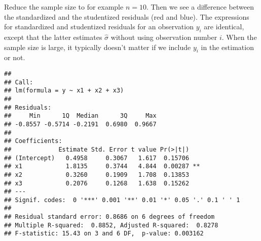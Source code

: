 \documentclass[]{article}
\newenvironment{Shaded}{\begin{snugshade}}{\end{snugshade}}
\newcommand{\KeywordTok}[1]{\textcolor[rgb]{0.13,0.29,0.53}{\textbf{#1}}}
\newcommand{\DataTypeTok}[1]{\textcolor[rgb]{0.13,0.29,0.53}{#1}}
\newcommand{\DecValTok}[1]{\textcolor[rgb]{0.00,0.00,0.81}{#1}}
\newcommand{\OperatorTok}[1]{\textcolor[rgb]{0.81,0.36,0.00}{\textbf{#1}}}
\newcommand{\NormalTok}[1]{#1}
\begin{document}
Reduce the sample size to for example \(n=10\). Then we see a difference
between the standardized and the studentized residuals (red and blue).
The expressions for standardized and studentized residuals for an
observation \(y_i\) are identical, except that the latter estimates
\(\hat{\sigma}\) without using observation number \(i\). When the sample
size is large, it typically doesn't matter if we include \(y_i\) in the
estimation or not.

\begin{Shaded}
\end{Shaded}

\begin{verbatim}
## 
## Call:
## lm(formula = y ~ x1 + x2 + x3)
## 
## Residuals:
##     Min      1Q  Median      3Q     Max 
## -0.8557 -0.5714 -0.2191  0.6980  0.9667 
## 
## Coefficients:
##             Estimate Std. Error t value Pr(>|t|)   
## (Intercept)   0.4958     0.3067   1.617  0.15706   
## x1            1.8135     0.3744   4.844  0.00287 **
## x2            0.3260     0.1909   1.708  0.13853   
## x3            0.2076     0.1268   1.638  0.15262   
## ---
## Signif. codes:  0 '***' 0.001 '**' 0.01 '*' 0.05 '.' 0.1 ' ' 1
## 
## Residual standard error: 0.8686 on 6 degrees of freedom
## Multiple R-squared:  0.8852, Adjusted R-squared:  0.8278 
## F-statistic: 15.43 on 3 and 6 DF,  p-value: 0.003162
\end{verbatim}
\end{document}
